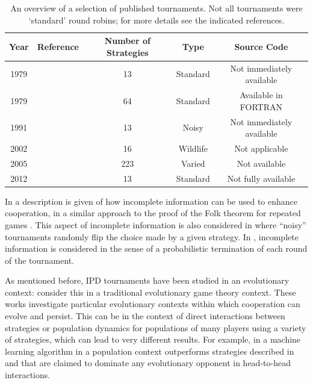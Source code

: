 \documentclass{jors}
\begin{document}
\begin{table}[!hbtp]
    \begin{center}
        \begin{tabular}{ccccc}
            \toprule
            Year     & Reference                  & Number of Strategies & Type     & Source Code\\
            \midrule
            1979     & \cite{Axelrod1980a}        & 13                   & Standard & Not immediately available\\
            1979     & \cite{Axelrod1980b}        & 64                   & Standard & Available in FORTRAN\\
            1991     & \cite{Bendor1991}          & 13                   & Noisy    & Not immediately available\\
            2002     & \cite{Stephens2002}        & 16                   & Wildlife & Not applicable\\
            2005     & \cite{kendall2007iterated} & 223                  & Varied   & Not available \\
            2012     & \cite{Stewart2012}         & 13                   & Standard & Not fully available \\
            \bottomrule
        \end{tabular}
    \end{center}
    \caption{An overview of a selection of published tournaments. Not all
             tournaments were `standard' round robins; for more details
             see the indicated references.}\label{tab:tournaments}
\end{table}

In \cite{Milgrom1982} a description is given of how incomplete information can
be used to enhance cooperation, in a similar approach to the proof of the Folk
theorem for repeated games \cite{Maschler2013}. This aspect of incomplete
information is also considered in \cite{Bendor1991, Lee2015, Molander1985} where
``noisy'' tournaments randomly flip the choice made by a given strategy. In
\cite{Murnighan2015}, incomplete information is considered in the sense of a
probabilistic termination of each round of the tournament.

As mentioned before, IPD tournaments have been studied in an evolutionary
context: \cite{Ellison1994, Lee2015, Press2012, Stewart2012} consider this in a
traditional evolutionary game theory context. These works investigate
particular evolutionary contexts within which cooperation can evolve and
persist. This can be in the context of direct interactions between strategies
or population dynamics for populations of many players using a variety of
strategies, which can lead to very different results. For example, in
\cite{Lee2015} a machine learning algorithm in a population context outperforms
strategies described in \cite{Press2012} and \cite{Stewart2012} that are
claimed to dominate any evolutionary opponent in head-to-head interactions.
\end{document}
